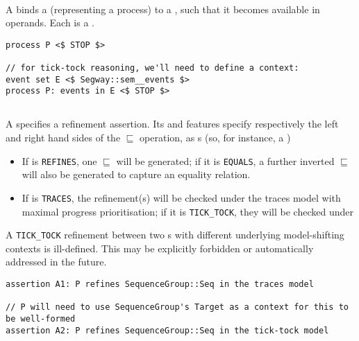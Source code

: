 \paragraph{\mprocesscspfragment}

A \mprocesscspfragment{} binds a  (representing a process)
to a , such that it becomes available in
\mcsprefinementproperty{} operands.  Each \mprocesscspfragment{} is a
\mcspprocesssource.

\begin{lstlisting}[style=Example]
process P <$ STOP $>

// for tick-tock reasoning, we'll need to define a context:
event set E <$ Segway::sem__events $>
process P: events in E <$ STOP $>
\end{lstlisting}

\subsection{\mcsprefinementproperty}

A \mcsprefinementproperty{} specifies a \cspm{} refinement assertion.
Its  and  features
specify respectively the left and right hand sides of the \(\sqsubseteq\)
operation, as \mcspprocesssource s (so, for instance, a )

\begin{itemize}
\item
	If  is \texttt{REFINES}, one \(\sqsubseteq\) will be
	generated; if it is \texttt{EQUALS}, a further inverted \(\sqsubseteq\)
	will also be generated to capture an equality relation.
\item
	If  is \texttt{TRACES}, the refinement(s) will be
	checked under the traces model with maximal progress prioritisation;
	if it is \texttt{TICK\_TOCK}, they will be checked under 
\end{itemize}

\begin{remark}
A \texttt{TICK\_TOCK} refinement between two \mcspprocesssource s with different
underlying model-shifting contexts is ill-defined.  This may be explicitly
forbidden or automatically addressed in the future.
\end{remark}

\begin{lstlisting}[style=Example]
assertion A1: P refines SequenceGroup::Seq in the traces model

// P will need to use SequenceGroup's Target as a context for this to be well-formed
assertion A2: P refines SequenceGroup::Seq in the tick-tock model
\end{lstlisting}

